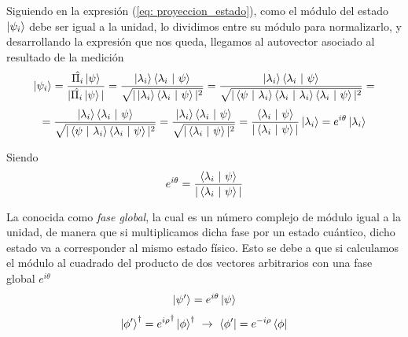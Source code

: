 \documentclass[12pt]{article}
\numberwithin{equation}{section} %
\begin{document}
    Siguiendo en la expresión (\ref{eq: proyeccion_estado}), como el módulo del estado \( \ket{\psi_{i}} \) debe ser igual a la unidad, lo dividimos entre su módulo para normalizarlo, y desarrollando la expresión que nos queda, llegamos al autovector asociado al resultado de la medición
    \vspace{1mm}
    \begin{equation*}
        \ket{\psi_{i}} = \frac{\hat{\Pi_{i}} \ket{\psi}}{| \hat{\Pi_{i}} \ket{\psi} |} = \frac{\ket{\lambda_{i}} \braket{\lambda_{i} \ | \ \psi}}{\sqrt{| \ket{\lambda_{i}} \braket{\lambda_{i} \ | \ \psi} | ^ {2}}} = \frac{\ket{\lambda_{i}} \braket{\lambda_{i} \ | \ \psi}}{\sqrt{| \braket{\psi \ | \ \lambda_{i}} \braket{\lambda_{i} \ | \ \lambda_{i}} \braket{\lambda_{i} \ | \ \psi} | ^ {2}}} = 
    \end{equation*}
    \begin{equation*}
        = \frac{\ket{\lambda_{i}} \braket{\lambda_{i} \ | \ \psi}}{\sqrt{| \braket{\psi \ | \ \lambda_{i}} \braket{\lambda_{i} \ | \ \psi} | ^ {2}}} = \frac{\ket{\lambda_{i}} \braket{\lambda_{i} \ | \ \psi}}{\sqrt{| \braket{\lambda_{i} \ | \ \psi} | ^ {2}}} = \frac{\braket{\lambda_{i} \ | \ \psi}}{| \braket{\lambda_{i} \ | \ \psi} |} \ket{\lambda_{i}} = e^{i \theta} \ket{\lambda_{i}}
    \end{equation*}

    \vspace{1.5mm}

    Siendo
    \begin{equation}
        e ^ {i \theta} = \frac{\braket{\lambda_{i} \ | \ \psi}}{| \braket{\lambda_{i} \ | \ \psi} |}
    \end{equation}

    \vspace{2.5mm}

    La conocida como \textit{fase global}, la cual es un número complejo de módulo igual a la unidad, de manera que si multiplicamos dicha fase por un estado cuántico, dicho estado va a corresponder al mismo estado físico. Esto se debe a que si calculamos el módulo al cuadrado del producto de dos vectores arbitrarios con una fase global \( e ^ {i \theta} \)
    \begin{equation*}
        \ket{\psi'} = e^{i \theta} \ket{\psi}
    \end{equation*}
    \begin{equation*}
        \ket{\phi'}^{\dagger} = {e^{i \rho}}^{\dagger} \ket{\phi}^{\dagger} \ \rightarrow \ \bra{\phi'} = e^{-i \rho} \bra{\phi}
    \end{equation*}
\end{document}
